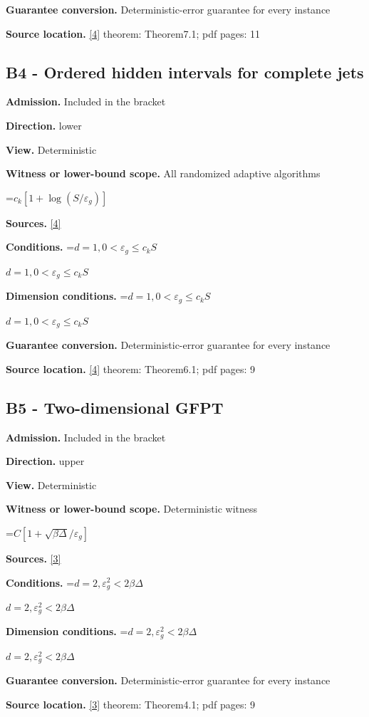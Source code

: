 \documentclass[10pt,a4paper]{article}
\newcommand{\AtlasMath}[1]{\par\begingroup\centering\setbox0=\hbox{$\displaystyle #1$}\ifdim\wd0>1.4\linewidth\typeout{ATLAS WIDE FORMULA: \the\wd0}\fi\ifdim\wd0>\linewidth\resizebox{\linewidth}{!}{\box0}\else\box0\fi\par\endgroup}
\newcommand{\AtlasInlineMath}[1]{\begingroup\setbox0=\hbox{$#1$}\ifdim\wd0>.4\linewidth\endgroup\AtlasMath{#1}\else\endgroup$#1$\fi}
\begin{document}
\textbf{Guarantee conversion.} Deterministic-error guarantee for every instance

\textbf{Source location.} \href{https://arxiv.org/abs/2610.16295}{[4]} theorem: Theorem7.1; pdf pages: 11

\subsection{B4 - Ordered hidden intervals for complete jets}
\textbf{Admission.} Included in the bracket

\textbf{Direction.} lower

\textbf{View.} Deterministic

\textbf{Witness or lower-bound scope.} All randomized adaptive algorithms

\AtlasMath{c_k[1+\log(S/\varepsilon_g)]}
\textbf{Sources.} \href{https://arxiv.org/abs/2610.16295}{[4]}

\textbf{Conditions.} \AtlasInlineMath{d=1,0<\varepsilon_g\le c_k S}

\textbf{Dimension conditions.} \AtlasInlineMath{d=1,0<\varepsilon_g\le c_k S}

\textbf{Guarantee conversion.} Deterministic-error guarantee for every instance

\textbf{Source location.} \href{https://arxiv.org/abs/2610.16295}{[4]} theorem: Theorem6.1; pdf pages: 9

\subsection{B5 - Two-dimensional GFPT}
\textbf{Admission.} Included in the bracket

\textbf{Direction.} upper

\textbf{View.} Deterministic

\textbf{Witness or lower-bound scope.} Deterministic witness

\AtlasMath{C[1+\sqrt{\beta\Delta}/\varepsilon_g]}
\textbf{Sources.} \href{https://arxiv.org/abs/2310.09157}{[3]}

\textbf{Conditions.} \AtlasInlineMath{d=2, \varepsilon_g^2<2\beta\Delta}

\textbf{Dimension conditions.} \AtlasInlineMath{d=2, \varepsilon_g^2<2\beta\Delta}

\textbf{Guarantee conversion.} Deterministic-error guarantee for every instance

\textbf{Source location.} \href{https://arxiv.org/abs/2310.09157}{[3]} theorem: Theorem4.1; pdf pages: 9
\end{document}
